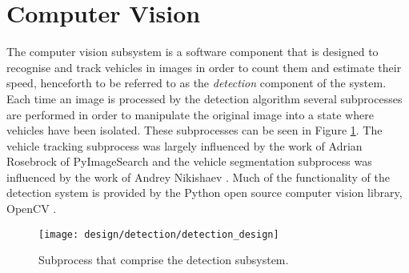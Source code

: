 \section{Computer Vision}

The computer vision subsystem is a software component that is designed to recognise and track vehicles in images in order to count them and estimate their speed, henceforth to be referred to as the \emph{detection} component of the system. Each time an image is processed by the detection algorithm several subprocesses are performed in order to manipulate the original image into a state where vehicles have been isolated. These subprocesses can be seen in Figure \ref{fig:detection_design}. The vehicle tracking subprocess was largely influenced by the work of Adrian Rosebrock \cite{adrian_rosebrock_simple_object_tracking}\cite{adrian_rosebrock_vehicle_tracking} of PyImageSearch and the vehicle segmentation subprocess was influenced by the work of Andrey Nikishaev \cite{andrey_nikishaev_traffic_counting}. Much of the functionality of the detection system is provided by the Python open source computer vision library, OpenCV \cite{opencv}.


\begin{figure}[H]
    \texttt{[image: design/detection/detection\_design]}
    \caption{Subprocess that comprise the detection subsystem.}
    \label{fig:detection_design}
\end{figure}








